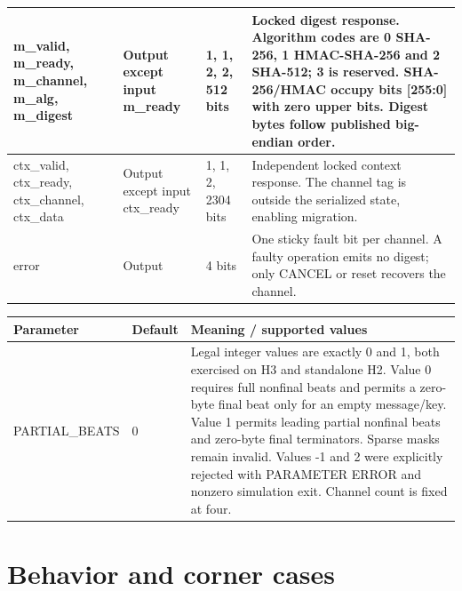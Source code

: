 \documentclass[11pt,a4paper]{article}
\begin{document}
{\begin{longtable}{@{}L{0.21\textwidth}|L{0.12\textwidth}|L{0.12\textwidth}|L{0.45\textwidth}@{}}
m\_\allowbreak{}valid,\allowbreak{} m\_\allowbreak{}ready,\allowbreak{} m\_\allowbreak{}channel,\allowbreak{} m\_\allowbreak{}alg,\allowbreak{} m\_\allowbreak{}digest & Output except input m\_\allowbreak{}ready & 1,\allowbreak{} 1,\allowbreak{} 2,\allowbreak{} 2,\allowbreak{} 512 bits & Locked digest response. Algorithm codes are 0 SHA-256,\allowbreak{} 1 HMAC-SHA-256 and 2 SHA-512; 3 is reserved. SHA-256/\allowbreak{}HMAC occupy bits [\allowbreak{}255:0]\allowbreak{} with zero upper bits. Digest bytes follow published big-endian order.\\[2pt]\hline

ctx\_\allowbreak{}valid,\allowbreak{} ctx\_\allowbreak{}ready,\allowbreak{} ctx\_\allowbreak{}channel,\allowbreak{} ctx\_\allowbreak{}data & Output except input ctx\_\allowbreak{}ready & 1,\allowbreak{} 1,\allowbreak{} 2,\allowbreak{} 2304 bits & Independent locked context response. The channel tag is outside the serialized state,\allowbreak{} enabling migration.\\[2pt]\hline

error & Output & 4 bits & One sticky fault bit per channel. A faulty operation emits no digest; only CANCEL or reset recovers the channel.\\[2pt]\hline

\bottomrule\end{longtable}}

{\small\renewcommand{\arraystretch}{1.18}\begin{longtable}{@{}L{0.22\textwidth}|L{0.21\textwidth}|L{0.49\textwidth}@{}}\toprule

\textbf{Parameter} & \textbf{Default} & \textbf{Meaning /\allowbreak{} supported values}\\\midrule\endhead

PARTIAL\_\allowbreak{}BEATS & 0 & Legal integer values are exactly 0 and 1,\allowbreak{} both exercised on H3 and standalone H2. Value 0 requires full nonfinal beats and permits a zero-byte final beat only for an empty message/\allowbreak{}key. Value 1 permits leading partial nonfinal beats and zero-byte final terminators. Sparse masks remain invalid. Values -1 and 2 were explicitly rejected with PARAMETER ERROR and nonzero simulation exit. Channel count is fixed at four.\\[2pt]\hline

\bottomrule\end{longtable}}

\section{Behavior and corner cases}
\end{document}
